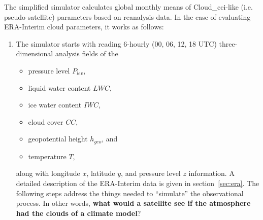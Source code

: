 

The simplified simulator calculates global monthly means of Cloud\_cci-like (i.e.
pseudo-satellite) parameters based on reanalysis data.
In the case of evaluating ERA-Interim cloud parameters, it works as follows:
\begin{enumerate}[label=(\alph*)]


 \item\label{it:readdata} 
The simulator starts with reading 6-hourly (00, 06, 12, 18 UTC)
three-dimensional analysis fields of the
\begin{itemize}
	\item pressure level $P_{lev}$,
	\item liquid water content $LWC$,
	\item ice water content $IWC$,
	\item cloud cover $CC$,
	\item geopotential height $h_{geo}$, and
	\item temperature $T$,
\end{itemize}
along with longitude $x$, latitude $y$, and pressure level $z$ information. 
A detailed description of the ERA-Interim data is given
in section~\ref{sec:era}.
The following steps address the things needed to ``simulate'' the observational process.
In other words, \textbf{what would a satellite see if the atmosphere had the clouds
of a climate model}?





\end{enumerate}
